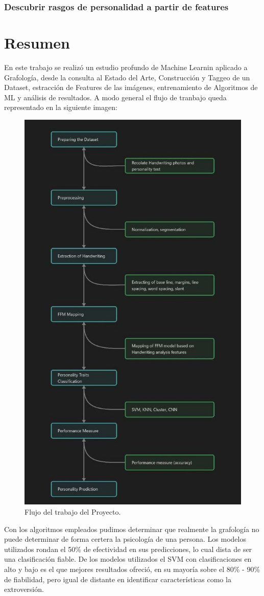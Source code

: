 \documentclass[10pt, a4paper]{article}
\begin{document}
		\subsubsection{Descubrir rasgos de personalidad a partir de features}
    
    \section{Resumen}
        En este trabajo se realiz\'o un estudio profundo de Machine Learnin aplicado a Grafolog\'ia, desde la consulta al Estado del Arte, Construcci\'on y Taggeo de 
        un Dataset, estracci\'on de Features de las im\'agenes, entrenamiento de Algoritmos de ML y an\'alisis de resultados. A modo general el flujo de tranbajo queda representado 
        en la siguiente imagen: 

        \begin{figure}[!h]
            \centering
            \includegraphics[width = 0.5\linewidth]{photo_2023-05-29_02-40-00.jpg}
            \caption{Flujo del trabajo del Proyecto.}
        \end{figure}

        Con los algoritmos empleados pudimos determinar que realmente la grafolog\'ia no puede determinar de 
        forma certera la psicolog\'ia de una persona. Los modelos utilizados rondan el 50\% de efectividad en sus predicciones, 
        lo cual dista de ser una clasificaci\'on fiable. De los modelos utilizados el SVM con clasificaciones en alto y bajo es el que mejores 
        resultados ofreci\'o, en su mayor\'ia sobre el 80\% - 90\% de fiabilidad, pero igual de distante en identificar caracter\'isticas como la extroversi\'on.\\ 
\end{document}
